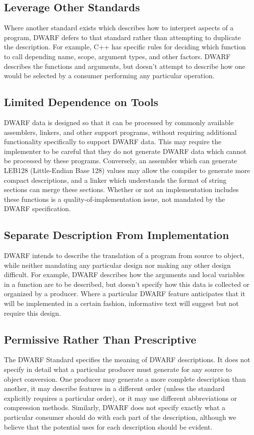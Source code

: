 \subsection{Leverage Other Standards}
Where another standard exists which describes how to interpret 
aspects of a program, DWARF defers to that standard rather than 
attempting to duplicate the description.  For example, C++ has 
specific rules for deciding which function to call depending 
name, scope, argument types, and other factors.  DWARF describes 
the functions and arguments, but doesn't attempt to describe 
how one would be selected by a consumer performing any particular 
operation.

\subsection{Limited Dependence on Tools}
DWARF data is designed so that it can be processed by commonly 
available assemblers, linkers, and other support programs, 
without requiring additional functionality specifically to 
support DWARF data.  This may require the implementer to be 
careful that they do not generate DWARF data which cannot be 
processed by these programs.  Conversely, an assembler which 
can generate LEB128 (Little-Endian Base 128) 
values may allow the compiler to generate 
more compact descriptions, and a linker which understands the 
format of string sections can merge these sections.  Whether 
or not an implementation includes these functions is a 
quality-of-implementation issue, not mandated by the DWARF 
specification.

\subsection{Separate Description From Implementation}
DWARF intends to describe the translation of a program from 
source to object, while neither mandating any particular design 
nor making any other design difficult.  For example, DWARF 
describes how the arguments and local variables in a function 
are to be described, but doesn't specify how this data is 
collected or organized by a producer.  Where a particular DWARF 
feature anticipates that it will be implemented in a certain 
fashion, informative text will suggest but not require this design.

\subsection{Permissive Rather Than Prescriptive}
The DWARF Standard specifies the meaning of DWARF descriptions. It does not
specify in detail what a particular producer must generate for any source to
object conversion.  One producer may generate a more complete description
than another, it may describe features in a different order (unless the 
standard explicitly requires a particular order), or it may use
different abbreviations or compression methods.  Similarly, DWARF does not
specify exactly what a particular consumer should do with each part of the
description, although we believe that the potential uses for each description
should be evident.

